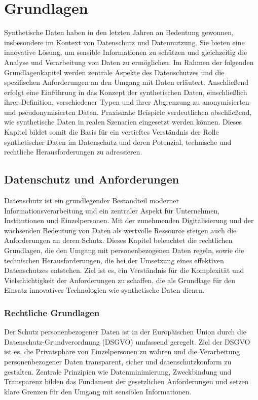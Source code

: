 \documentclass[../main.tex]{subfiles}
\begin{document}
\chapter{Grundlagen}

Synthetische Daten haben in den letzten Jahren an Bedeutung gewonnen, insbesondere im Kontext von Datenschutz und Datennutzung. Sie bieten eine innovative Lösung, um sensible Informationen zu schützen und gleichzeitig die Analyse und Verarbeitung von Daten zu ermöglichen. Im Rahmen der folgenden Grundlagenkapitel werden zentrale Aspekte des Datenschutzes und die spezifischen Anforderungen an den Umgang mit Daten erläutert. Anschließend erfolgt eine Einführung in das Konzept der synthetischen Daten, einschließlich ihrer Definition, verschiedener Typen und ihrer Abgrenzung zu anonymisierten und pseudonymisierten Daten. Praxisnahe Beispiele verdeutlichen abschließend, wie synthetische Daten in realen Szenarien eingesetzt werden können. Dieses Kapitel bildet somit die Basis für ein vertieftes Verständnis der Rolle synthetischer Daten im Datenschutz und deren Potenzial, technische und rechtliche Herausforderungen zu adressieren.

\section{Datenschutz und Anforderungen}

Datenschutz ist ein grundlegender Bestandteil moderner Informationsverarbeitung und ein zentraler Aspekt für Unternehmen, Institutionen und Einzelpersonen. Mit der zunehmenden Digitalisierung und der wachsenden Bedeutung von Daten als wertvolle Ressource steigen auch die Anforderungen an deren Schutz. Dieses Kapitel beleuchtet die rechtlichen Grundlagen, die den Umgang mit personenbezogenen Daten regeln, sowie die technischen Herausforderungen, die bei der Umsetzung eines effektiven Datenschutzes entstehen. Ziel ist es, ein Verständnis für die Komplexität und Vielschichtigkeit der Anforderungen zu schaffen, die als Grundlage für den Einsatz innovativer Technologien wie synthetische Daten dienen.

\subsection{Rechtliche Grundlagen}

Der Schutz personenbezogener Daten ist in der Europäischen Union durch die Datenschutz-Grundverordnung (DSGVO) umfassend geregelt. Ziel der DSGVO ist es, die Privatsphäre von Einzelpersonen zu wahren und die Verarbeitung personenbezogener Daten transparent, sicher und datenschutzkonform zu gestalten. Zentrale Prinzipien wie Datenminimierung, Zweckbindung und Transparenz bilden das Fundament der gesetzlichen Anforderungen und setzen klare Grenzen für den Umgang mit sensiblen Informationen.
\end{document}

